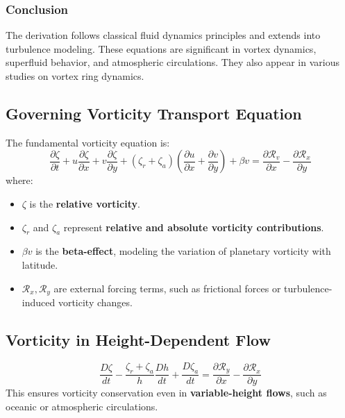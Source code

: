 \documentclass[a4paper,12pt]{article}
\begin{document}
    \subsubsection*{Conclusion}
    The derivation follows classical fluid dynamics principles and extends into turbulence modeling. These equations are significant in vortex dynamics, superfluid behavior, and atmospheric circulations. They also appear in various studies on vortex ring dynamics.

    \subsection{Governing Vorticity Transport Equation}
    The fundamental vorticity equation is:
    \begin{equation}
        \frac{\partial \zeta}{\partial t} + u \frac{\partial \zeta}{\partial x} + v \frac{\partial \zeta}{\partial y} + \left( \zeta_r + \zeta_a \right) \left( \frac{\partial u}{\partial x} + \frac{\partial v}{\partial y} \right) + \beta v = \frac{\partial \mathcal{R}_v}{\partial x} - \frac{\partial \mathcal{R}_x}{\partial y}
    \end{equation}
    where:
    \begin{itemize}
        \item $\zeta$ is the \textbf{relative vorticity}.
        \item $\zeta_r$ and $\zeta_a$ represent \textbf{relative and absolute vorticity contributions}.
        \item $\beta v$ is the \textbf{beta-effect}, modeling the variation of planetary vorticity with latitude.
        \item $\mathcal{R}_x, \mathcal{R}_y$ are external forcing terms, such as frictional forces or turbulence-induced vorticity changes.
    \end{itemize}

    \subsection{Vorticity in Height-Dependent Flow}
    \begin{equation*}
        \frac{D \zeta}{d t} - \frac{ \zeta_r + \zeta_a }{h}  \frac{D h}{d t} + \frac{D \zeta_a}{d t}  = \frac{\partial \mathcal{R}_y}{\partial x} - \frac{\partial \mathcal{R}_x}{\partial y}
    \end{equation*}
    This ensures vorticity conservation even in \textbf{variable-height flows}, such as oceanic or atmospheric circulations.
\end{document}
